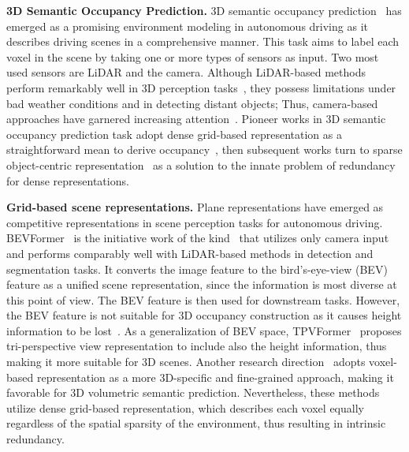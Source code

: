 \textbf{3D Semantic Occupancy Prediction.}
3D semantic occupancy prediction~\cite{cao2022monoscene,huang2023tri,tian2023occ3d} has emerged as a promising environment modeling in autonomous driving as it describes driving scenes in a comprehensive manner. 
This task aims to label each voxel in the scene by taking one or more types of sensors as input. 
Two most used sensors are LiDAR and the camera. 
Although LiDAR-based methods perform remarkably well in 3D perception tasks~\cite{cheng20212s3net, liong2020amvnet, tang2020searching, ye2023lidarmultinet, ye2021drinet++, lang2019pointpillars, zhou2018voxelnet, chen2017multi, yan2021JS3CNet, lmscnet, aicnet, 3DSketch, cao2022monoscene}, they possess limitations under bad weather conditions and in detecting distant objects; 
Thus, camera-based approaches have garnered increasing attention~\cite{wei2023surroundocc,yu2023flashocc,li2023fb}. 
Pioneer works in 3D semantic occupancy prediction task adopt dense grid-based representation as a straightforward mean to derive occupancy~\cite{li2023voxformer,wei2023surroundocc,3Chen20193DSS}, then subsequent works turn to sparse object-centric representation~\cite{tang2024sparseocc,lu2023octreeocc,huang2024gaussian} as a solution to the innate problem of redundancy for dense representations. 

\textbf{Grid-based scene representations.}
Plane representations have emerged as competitive representations in scene perception tasks for autonomous driving. 
BEVFormer~\cite{li2022bevformer} is the initiative work of the kind~\cite{huang2021bevdet, li2022bevdepth, philion2020lss, liang2022bevfusion, liu2023bevfusion} that utilizes only camera input and performs comparably well with LiDAR-based methods in detection and segmentation tasks. 
It converts the image feature to the bird's-eye-view (BEV) feature as a unified scene representation, since the information is most diverse at this point of view.
The BEV feature is then used for downstream tasks.
However, the BEV feature is not suitable for 3D occupancy construction as it causes height information to be lost~\cite{wei2023surroundocc}. 
As a generalization of BEV space, TPVFormer~\cite{ huang2023tri} proposes tri-perspective view representation to include also the height information, thus making it more suitable for 3D scenes. 
Another research direction~\cite{wei2023surroundocc, li2023voxformer} adopts voxel-based representation as a more 3D-specific and fine-grained approach, making it favorable for 3D volumetric semantic prediction. 
Nevertheless, these methods utilize dense grid-based representation, which describes each voxel equally regardless of the spatial sparsity of the environment, thus resulting in intrinsic redundancy.

